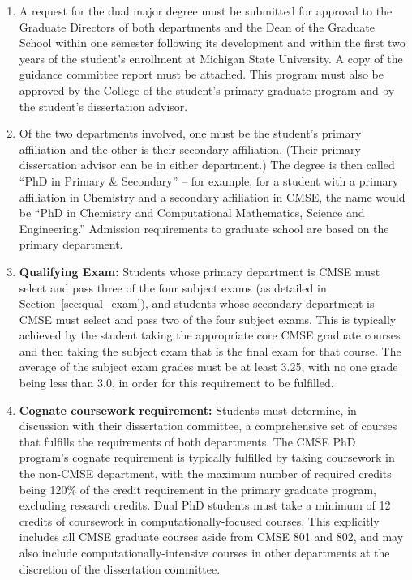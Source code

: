 \begin{enumerate}

\item  A request for the dual major degree must be submitted for
  approval to the Graduate Directors of both departments and the Dean
  of the Graduate School within one semester following its development
  and within the first two years of the student’s enrollment at
  Michigan State University.  A copy of the guidance committee report
  must be attached.  This program must also be approved by the College
  of the student's primary graduate program and by the student's
  dissertation advisor.

\item Of the two departments involved, one must be the student's
  primary affiliation and the other is their secondary affiliation.
  (Their primary dissertation advisor can be in either department.)  The
  degree is then called ``PhD in Primary \& Secondary'' -- for
  example, for a student with a primary affiliation in Chemistry and a
  secondary affiliation in CMSE, the name would be ``PhD in Chemistry
  and Computational Mathematics, Science and Engineering.'' Admission
  requirements to graduate school are based on the primary department.

\item \textbf{Qualifying Exam:} Students whose primary department is
  CMSE must select and pass three of the four subject exams (as
  detailed in Section~\ref{sec:qual_exam}), and students whose
  secondary department is CMSE must select and pass two of the four
  subject exams.  This is typically achieved by the student taking the
  appropriate core CMSE graduate courses and then taking the subject
  exam that is the final exam for that course.  The average of the
  subject exam grades must be at least 3.25, with no one grade being
  less than 3.0, in order for this requirement to be fulfilled. 

\item \textbf{Cognate coursework requirement:}  Students must
  determine, in discussion with their dissertation committee, a
  comprehensive set of courses that fulfills the requirements of both
  departments.  The CMSE PhD program's cognate requirement is
  typically fulfilled by taking coursework in the non-CMSE department,
  with the maximum number of required credits being 120\% of the
  credit requirement in the primary graduate program, excluding
  research credits.  Dual PhD students
  must take a minimum of 12 credits of coursework in
  computationally-focused courses.  This explicitly includes all CMSE
  graduate courses aside from CMSE 801 and 802, and may also include
  computationally-intensive courses in other departments at the
  discretion of the dissertation committee.


\end{enumerate}
